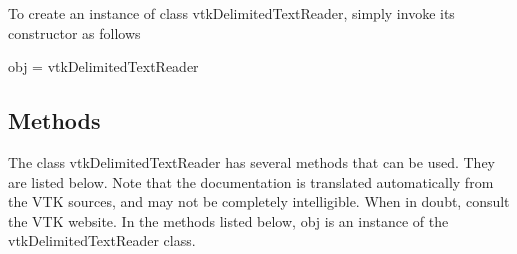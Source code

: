 To create an instance of class vtk\-Delimited\-Text\-Reader, simply invoke its constructor as follows \begin{DoxyVerb}  obj = vtkDelimitedTextReader
\end{DoxyVerb}
 \hypertarget{vtkwidgets_vtkxyplotwidget_Methods}{}\subsection{Methods}\label{vtkwidgets_vtkxyplotwidget_Methods}
The class vtk\-Delimited\-Text\-Reader has several methods that can be used. They are listed below. Note that the documentation is translated automatically from the V\-T\-K sources, and may not be completely intelligible. When in doubt, consult the V\-T\-K website. In the methods listed below, {\ttfamily obj} is an instance of the vtk\-Delimited\-Text\-Reader class. 
